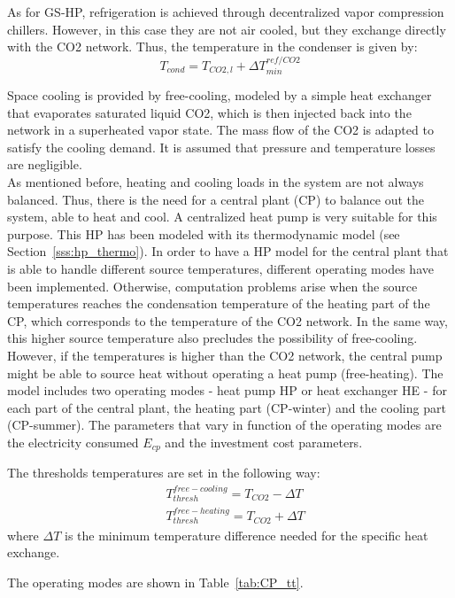 \documentclass{article}
\begin{document}
As for GS-HP, refrigeration is achieved through decentralized vapor compression chillers. However, in this case they are not air cooled, but they exchange directly with the CO2 network. Thus, the temperature in the condenser is given by:
\begin{equation}
    T_{cond} = T_{CO2,l} + \Delta T_{min}^{ref/CO2}
\end{equation}

Space cooling is provided by free-cooling, modeled by a simple heat exchanger that evaporates saturated liquid CO2, which is then injected back into the network in a superheated vapor state. The mass flow of the CO2 is adapted to satisfy the cooling demand. It is assumed that pressure and temperature losses are negligible.\\

As mentioned before, heating and cooling loads in the system are not always balanced. Thus, there is the need for a central plant (CP) to balance out the system, able to heat and cool. A centralized heat pump is very suitable for this purpose. This HP has been modeled with its thermodynamic model (see Section~\ref{sss:hp_thermo}).
In order to have a HP model for the central plant that is able to handle different source temperatures, different operating modes have been implemented. Otherwise, computation problems arise when the source temperatures reaches the condensation temperature of the heating part of the CP, which corresponds to the temperature of the CO2 network. In the same way, this higher source temperature also precludes the possibility of free-cooling. However, if the temperatures is higher than the CO2 network, the central pump might be able to source heat without operating a heat pump (free-heating). The model includes two operating modes - heat pump HP or heat exchanger HE - for each part of the central plant, the heating part (CP-winter) and the cooling part (CP-summer). The parameters that vary in function of the operating modes are the electricity consumed $E_{cp}$ and the investment cost parameters. 

The thresholds temperatures are set in the following way:
\begin{align}
& T_{thresh}^{free-cooling} = T_{CO2} - \Delta T \\
& T_{thresh}^{free-heating} = T_{CO2} + \Delta T 
\end{align}
where $\Delta T$ is the minimum temperature difference needed for the specific heat exchange.

The operating modes are shown in Table~\ref{tab:CP_tt}.

\end{document}
